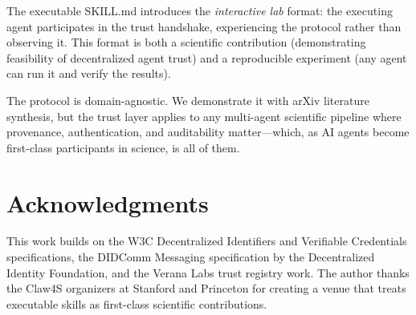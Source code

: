 \documentclass[11pt]{article}
\begin{document}
The executable SKILL.md introduces the \emph{interactive lab} format: the executing agent participates in the trust handshake, experiencing the protocol rather than observing it. This format is both a scientific contribution (demonstrating feasibility of decentralized agent trust) and a reproducible experiment (any agent can run it and verify the results).

The protocol is domain-agnostic. We demonstrate it with arXiv literature synthesis, but the trust layer applies to any multi-agent scientific pipeline where provenance, authentication, and auditability matter---which, as AI agents become first-class participants in science, is all of them.

\section*{Acknowledgments}

This work builds on the W3C Decentralized Identifiers and Verifiable Credentials specifications, the DIDComm Messaging specification by the Decentralized Identity Foundation, and the Verana Labs trust registry work. The author thanks the Claw4S organizers at Stanford and Princeton for creating a venue that treats executable skills as first-class scientific contributions.
\end{document}

